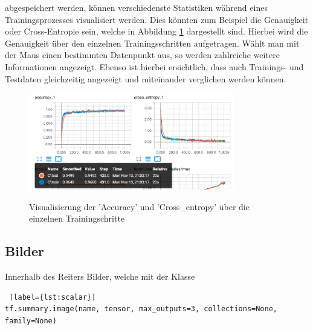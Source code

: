 \vspace{0.2cm}

abgespeichert werden, können verschiedenste Statistiken während eines Trainingsprozesses visualisiert werden. Dies könnten zum Beispiel die Genauigkeit oder Cross-Entropie sein, welche in Abbildung \ref{fig:skalare} dargestellt sind. Hierbei wird die Genauigkeit über den einzelnen Trainingsschritten aufgetragen. Wählt man mit der Maus einen bestimmten Datenpunkt aus, so werden zahlreiche weitere Informationen angezeigt. Ebenso ist hierbei ersichtlich, dass auch Trainings- und Testdaten gleichzeitig angezeigt und miteinander verglichen werden können. \cite{tensorboard.2017}

\begin{figure}[h!]
	\centering
	 \includegraphics[width=0.8\textwidth]{images/Kapitel_3/skalars.png}\\
	\vspace{10pt} 
	\caption[Visualisierung der 'Accuracy' und 'Cross\_entropy' über die einzelnen Trainingsschritte]{Visualisierung der 'Accuracy' und 'Cross\_entropy' über die einzelnen Trainingschritte}
	\label{fig:skalare}
\end{figure}





\subsection{Bilder}

Innerhalb des Reiters Bilder, welche mit der Klasse
\\

\begin{minipage}{\linewidth}
\begin{lstlisting} [label={lst:scalar}]
tf.summary.image(name, tensor, max_outputs=3, collections=None, family=None)
\end{lstlisting}
\end{minipage}


